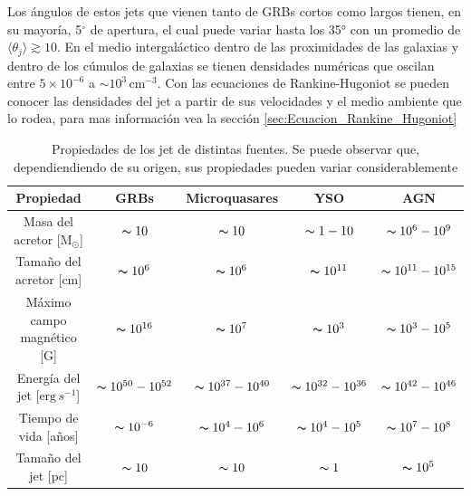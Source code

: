 \documentclass[12pt,a4paper]{book}
\begin{document}
Los ángulos de estos jets que vienen tanto de GRBs cortos como largos tienen, en su mayoría, 5$^{\circ}$ de apertura, el cual puede variar hasta los 35° con un promedio de 
$\langle \theta_j \rangle \gtrsim 10$.
En el medio intergaláctico dentro de las proximidades de las galaxias y dentro de los cúmulos de galaxias se tienen densidades numéricas que oscilan entre $5 \times 10^{-6}$ a 
$ \sim 10^3 \, \text{cm}^{-3}$. Con las ecuaciones de Rankine-Hugoniot se pueden conocer las densidades del jet a partir de sus velocidades y el medio ambiente que lo rodea, para mas información 
vea la sección \ref{sec:Ecuacion_Rankine_Hugoniot}



\begin{table}
  \begin{center}
    \begin{tabular}{ c c c c c } 
      \hline
      Propiedad                                   & GRBs                          & Microquasares                    & YSO                            & AGN                 \\
      \hline
      Masa del acretor [$\text{M}_{\odot }$]      & $\thicksim 10$                &    $\thicksim 10$                &  $\thicksim 1-10$              & $\thicksim 10^{6}-10^{9}$                       \\ 
      Tamaño del acretor [cm]                     & $\thicksim 10^{6}$            &    $\thicksim 10^{6}$            &  $\thicksim 10^{11}$           & $\thicksim 10^{11}-10^{15}$                      \\ 
      Máximo campo magnético [G]                  & $\thicksim 10^{16}$           &    $\thicksim 10^{7}$            &  $\thicksim 10^{3}$            & $\thicksim 10^{3}-10^{5}$                         \\ 
      Energía del jet [$\text{erg} \, s^{-1}$]    & $\thicksim 10^{50}-10^{52}$   &    $\thicksim 10^{37}-10^{40}$   &  $\thicksim 10^{32}-10^{36}$   & $\thicksim 10^{42}-10^{46}$                        \\ 
      Tiempo de vida [años]                       & $\thicksim 10^{-6}$           &    $\thicksim 10^{4}-10^{6}$     &  $\thicksim 10^{4}-10^{5}$     & $\thicksim 10^{7}-10^{8}$                           \\ 
      Tamaño del jet [pc]                         & $\thicksim 10$                &    $\thicksim 10$                &  $\thicksim 1$                 & $\thicksim 10^{5}$                                   \\ 
    \end{tabular}
  \caption{Propiedades de los jet de distintas fuentes. Se puede observar que, dependiendiendo de su origen, sus propiedades pueden variar considerablemente} \label{table:propiedades_jets}
  \end{center}

\end{table}
  
\end{document}
